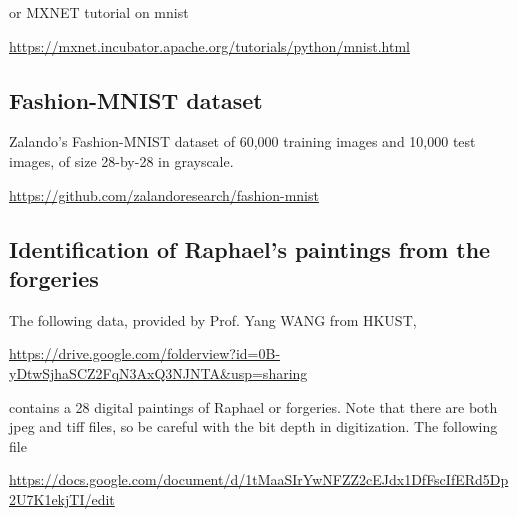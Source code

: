 \documentclass[11pt]{article}
\begin{document}
or MXNET tutorial on mnist

\url{https://mxnet.incubator.apache.org/tutorials/python/mnist.html}

\subsection{Fashion-MNIST dataset}

Zalando's Fashion-MNIST dataset of 60,000 training images and 10,000 test images, of size 28-by-28 in grayscale. 

\url{https://github.com/zalandoresearch/fashion-mnist}


\subsection{Identification of Raphael's paintings from the forgeries}

The following data, provided by Prof. Yang WANG from HKUST,

\url{https://drive.google.com/folderview?id=0B-yDtwSjhaSCZ2FqN3AxQ3NJNTA&usp=sharing}

\noindent contains a 28 digital paintings of Raphael or forgeries. Note that there are both jpeg and tiff files, so be careful with the bit depth in digitization. The following file

\url{https://docs.google.com/document/d/1tMaaSIrYwNFZZ2cEJdx1DfFscIfERd5Dp2U7K1ekjTI/edit}
\end{document}

